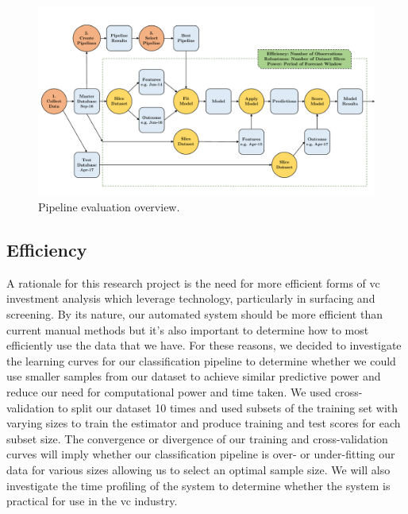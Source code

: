 \documentclass[../thesis/thesis.tex]{subfiles}
\begin{document}
\begin{figure}[!htb]
    \centering
    \includegraphics[width=\textwidth]{../figures/evaluation/pipeline_evaluation}
    \caption[Pipeline evaluation flowchart]{Pipeline evaluation overview.}
    \label{fig:evaluation:pipeline_evaluation}
\end{figure}

\subsection{Efficiency}

A rationale for this research project is the need for more efficient forms of \gls{vc} investment analysis which leverage technology, particularly in surfacing and screening. By its nature, our automated system should be more efficient than current manual methods but it's also important to determine how to most efficiently use the data that we have. For these reasons, we decided to investigate the learning curves for our classification pipeline to determine whether we could use smaller samples from our dataset to achieve similar predictive power and reduce our need for computational power and time taken. We used cross-validation to split our dataset 10 times and used subsets of the training set with varying sizes to train the estimator and produce training and test scores for each subset size. The convergence or divergence of our training and cross-validation curves will imply whether our classification pipeline is over- or under-fitting our data for various sizes allowing us to select an optimal sample size. We will also investigate the time profiling of the system to determine whether the system is practical for use in the \gls{vc} industry.


\end{document}

